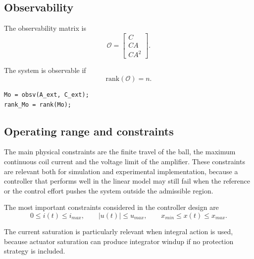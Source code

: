 \subsection{Observability}

The observability matrix is
\begin{equation}
    \mathcal{O} =
    \begin{bmatrix}
        C \\
        CA \\
        CA^2
    \end{bmatrix}.
\end{equation}

The system is observable if
\begin{equation}
    \mathrm{rank}(\mathcal{O}) = n.
\end{equation}

\begin{lstlisting}[style=matlabstyle,caption={Observability check.}]
Mo = obsv(A_ext, C_ext);
rank_Mo = rank(Mo);
\end{lstlisting}

\subsection{Operating range and constraints}

The main physical constraints are the finite travel of the ball, the maximum continuous coil current and the voltage limit of the amplifier. These constraints are relevant both for simulation and experimental implementation, because a controller that performs well in the linear model may still fail when the reference or the control effort pushes the system outside the admissible region.

The most important constraints considered in the controller design are
\begin{equation}
    0 \leq i(t) \leq i_{max},
    \qquad
    |u(t)| \leq u_{max},
    \qquad
    x_{min} \leq x(t) \leq x_{max}.
\end{equation}

The current saturation is particularly relevant when integral action is used, because actuator saturation can produce integrator windup if no protection strategy is included.

